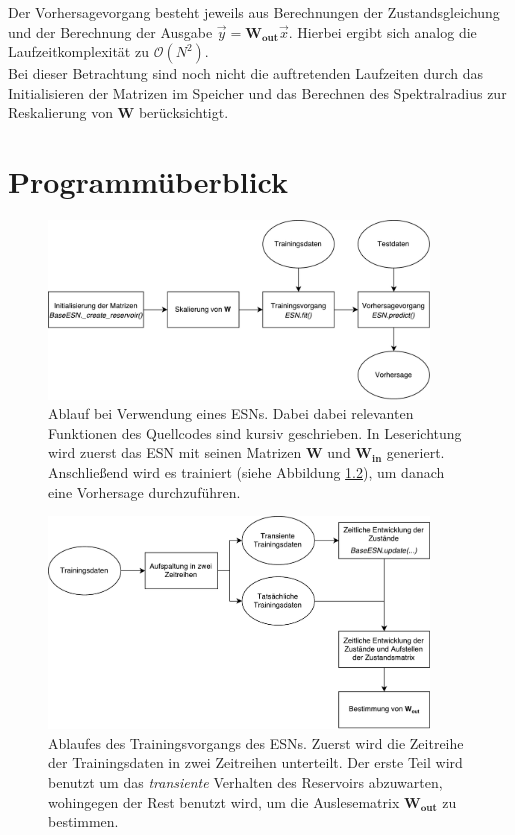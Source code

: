\begin{appendices}
Der Vorhersagevorgang besteht jeweils aus Berechnungen der Zustandsgleichung und der  Berechnung der Ausgabe $\vec{y} = \mathbf{W_{out}} \vec{x}$. Hierbei ergibt sich analog die Laufzeitkomplexität zu $\mathcal{O}(N^2)$.\\

Bei dieser Betrachtung sind noch nicht die auftretenden Laufzeiten durch das Initialisieren der Matrizen im Speicher und das Berechnen des Spektralradius zur Reskalierung von $\mathbf{W}$ berücksichtigt. 

\chapter{Programmüberblick}

\begin{figure}[h]
	\centering
	\includegraphics[width=0.9\textwidth]{figures/illustrations/esn_flow_chart.pdf}
  	\caption{Ablauf bei Verwendung eines \textsc{ESN}s. Dabei dabei relevanten Funktionen des Quellcodes sind kursiv geschrieben. In Leserichtung wird zuerst das \textsc{ESN} mit seinen Matrizen $\mathbf{W}$ und $\mathbf{W_{in}}$ generiert. Anschließend wird es trainiert (siehe Abbildung \ref{fig:apx_esn_training_flowchart}), um danach eine Vorhersage durchzuführen.}
  	  \label{fig:apx_esn_flowchart}
\end{figure}%

\begin{figure}[h]
	\centering
	\includegraphics[width=0.9\textwidth]{figures/illustrations/esn_training_flow_chart.pdf}
  	\caption{Ablaufes des Trainingsvorgangs des \textsc{ESN}s. Zuerst wird die Zeitreihe der Trainingsdaten in zwei Zeitreihen unterteilt. Der erste Teil wird benutzt um das \textit{transiente} Verhalten des Reservoirs abzuwarten, wohingegen der Rest benutzt wird, um die Auslesematrix $\mathbf{W_{out}}$ zu bestimmen.}
  	\label{fig:apx_esn_training_flowchart}
\end{figure}%


\end{appendices}
